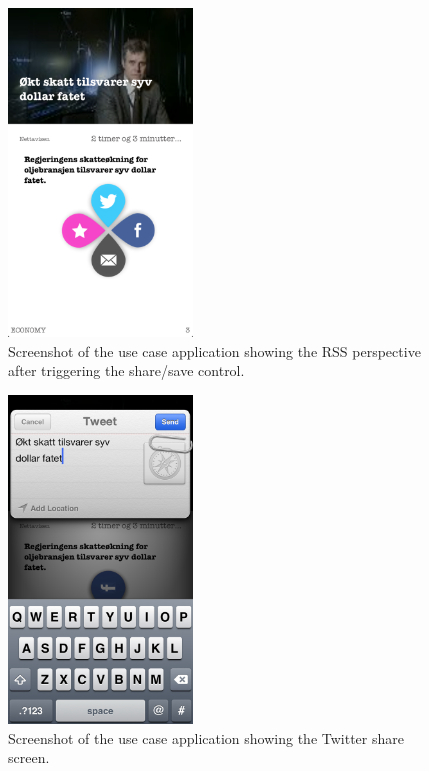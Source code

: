 \begin{figure}[!htbp]
\centering
\includegraphics[width=49mm]{GFX/usecase/rssShare.png}
\caption{Screenshot of the use case application showing the RSS perspective after triggering the share/save control.}
\label{usecase_share}
\end{figure}

\begin{figure}[!htbp]
\centering
\includegraphics[width=49mm]{GFX/usecase/twitter.png}
\caption{Screenshot of the use case application showing the Twitter share screen.}
\label{usecase_twitter}
\end{figure}

